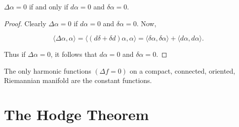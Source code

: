 \begin{proposition}\label{thm:6.3}
$ \Delta\alpha = 0 $ if and only if  $ d\alpha = 0 $ and  $ \delta\alpha = 0 $.

\end{proposition}

\begin{proof}
Clearly  $ \Delta\alpha = 0 $ if  $ d\alpha = 0 $ and  $ \delta\alpha = 0 $. Now,

\begin{equation}
\tag{1}\label{eq:6.3:1}
\langle\Delta\alpha,\alpha\rangle=\langle(d\delta+\delta d)\alpha,\alpha\rangle=\langle\delta\alpha,\delta\alpha\rangle+\langle d\alpha,d\alpha\rangle.
\end{equation}

Thus if  $ \Delta\alpha = 0 $, it follows that  $ d\alpha = 0 $ and  $ \delta\alpha = 0 $.

\end{proof}

\begin{corollary*}
The only harmonic functions $(\Delta f = 0)$ on a compact, connected, oriented, Riemannian manifold are the constant functions.
\end{corollary*}

\section{The Hodge Theorem}


